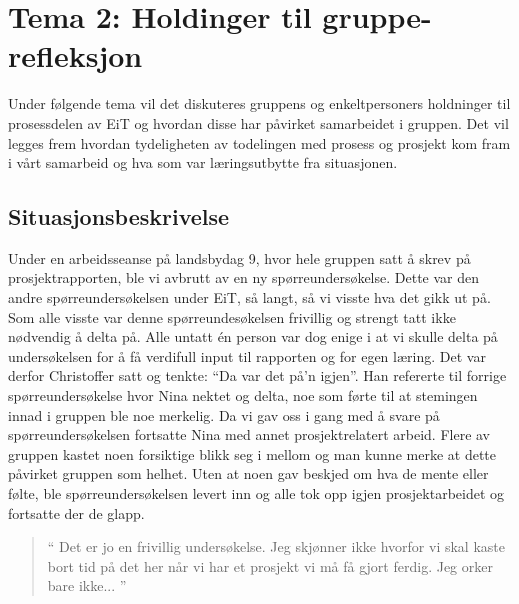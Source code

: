 \chapter{Tema 2: Holdinger til gruppe{-}\\refleksjon}

Under følgende tema vil det diskuteres gruppens og enkeltpersoners holdninger til prosessdelen av EiT og hvordan
disse har påvirket samarbeidet i gruppen. Det vil legges frem hvordan tydeligheten av todelingen med prosess og 
prosjekt kom fram i vårt samarbeid og hva som var læringsutbytte fra situasjonen. 

\section{Situasjonsbeskrivelse}

Under en arbeidsseanse på landsbydag 9, hvor hele gruppen satt å skrev på prosjektrapporten, ble vi avbrutt av
en ny spørreundersøkelse. Dette var den andre spørreundersøkelsen under EiT, så langt, så vi visste hva det gikk ut på.
Som alle visste var denne spørreundesøkelsen frivillig og strengt tatt ikke nødvendig å delta på. Alle untatt én person
var dog enige i at vi skulle delta på undersøkelsen for å få verdifull input til rapporten og for egen læring. Det var derfor
Christoffer satt og tenkte: ``Da var det på'n igjen''. Han refererte til forrige spørreundersøkelse hvor Nina nektet og delta,
noe som førte til at stemingen innad i gruppen ble noe merkelig. Da vi gav oss i gang med å svare på spørreundersøkelsen fortsatte Nina
med annet prosjektrelatert arbeid. Flere av gruppen kastet noen forsiktige blikk seg i mellom og man kunne merke at 
dette påvirket gruppen som helhet. Uten at noen gav beskjed om hva de mente eller følte, ble spørreundersøkelsen levert inn og 
alle tok opp igjen prosjektarbeidet og fortsatte der de glapp.

\begin{quote}``
Det er jo en frivillig undersøkelse. Jeg skjønner ikke hvorfor vi skal kaste bort tid på det her når vi har et prosjekt vi må få gjort ferdig. Jeg orker bare ikke...
''\end{quote} 

